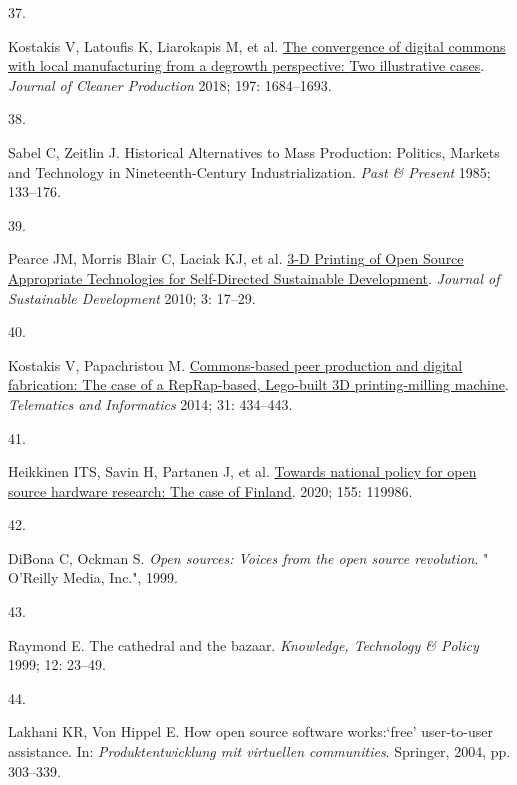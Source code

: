 \documentclass[
  12pt,
  a4paperpaper,
  onecolumn]{article}
\newlength{\cslhangindent}
\newlength{\csllabelwidth}
\newlength{\cslentryspacingunit} %
\newenvironment{CSLReferences}[2] %
 {%
  \setlength{\parindent}{0pt}
  \ifodd #1
  \let\oldpar\par
  \def\par{\hangindent=\cslhangindent\oldpar}
  \fi
  \setlength{\parskip}{#2\cslentryspacingunit}
 }%
 {}
\newcommand{\CSLLeftMargin}[1]{\parbox[t]{\csllabelwidth}{#1}}
\newcommand{\CSLRightInline}[1]{\parbox[t]{\linewidth - \csllabelwidth}{#1}\break}
\begin{document}
\begin{CSLReferences}{0}{0}
\leavevmode{}%
\CSLLeftMargin{37. }%
\CSLRightInline{Kostakis V, Latoufis K, Liarokapis M, et al.
\href{https://doi.org/10.1016/j.jclepro.2016.09.077}{The convergence of
digital commons with local manufacturing from a degrowth perspective:
{Two} illustrative cases}. \emph{Journal of Cleaner Production} 2018;
197: 1684--1693.}

\leavevmode{}%
\CSLLeftMargin{38. }%
\CSLRightInline{Sabel C, Zeitlin J. Historical {Alternatives} to {Mass
Production}: {Politics}, {Markets} and {Technology} in
{Nineteenth-Century Industrialization}. \emph{Past \& Present} 1985;
133--176.}

\leavevmode{}%
\CSLLeftMargin{39. }%
\CSLRightInline{Pearce JM, Morris Blair C, Laciak KJ, et al.
\href{https://doi.org/10.5539/jsd.v3n4p17}{3-{D Printing} of {Open
Source Appropriate Technologies} for {Self-Directed Sustainable
Development}}. \emph{Journal of Sustainable Development} 2010; 3:
17--29.}

\leavevmode{}%
\CSLLeftMargin{40. }%
\CSLRightInline{Kostakis V, Papachristou M.
\href{https://doi.org/10.1016/j.tele.2013.09.006}{Commons-based peer
production and digital fabrication: {The} case of a {RepRap-based},
{Lego-built 3D} printing-milling machine}. \emph{Telematics and
Informatics} 2014; 31: 434--443.}

\leavevmode{}%
\CSLLeftMargin{41. }%
\CSLRightInline{Heikkinen ITS, Savin H, Partanen J, et al.
\href{https://doi.org/10.1016/j.techfore.2020.119986}{Towards national
policy for open source hardware research: {The} case of {Finland}}.
2020; 155: 119986.}

\leavevmode{}%
\CSLLeftMargin{42. }%
\CSLRightInline{DiBona C, Ockman S. \emph{Open sources: Voices from the
open source revolution}. " O'Reilly Media, Inc.", 1999.}

\leavevmode{}%
\CSLLeftMargin{43. }%
\CSLRightInline{Raymond E. The cathedral and the bazaar.
\emph{Knowledge, Technology \& Policy} 1999; 12: 23--49.}

\leavevmode{}%
\CSLLeftMargin{44. }%
\CSLRightInline{Lakhani KR, Von Hippel E. How open source software
works:{`free'} user-to-user assistance. In: \emph{Produktentwicklung mit
virtuellen communities}. Springer, 2004, pp. 303--339.}


\end{CSLReferences}
\end{document}
